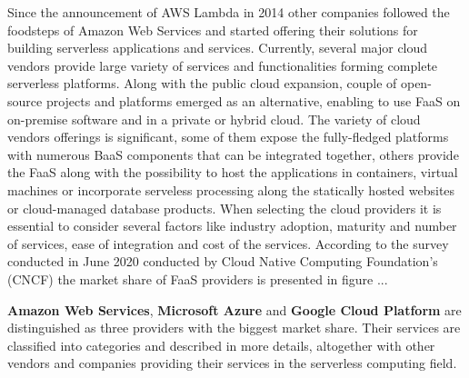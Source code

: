 Since the announcement of AWS Lambda in 2014 other companies followed the foodsteps of Amazon Web Services and started offering their solutions for building serverless applications and services. Currently, several major cloud vendors provide large variety of services and functionalities forming complete serverless platforms. Along with the public cloud expansion, couple of open-source projects and platforms emerged as an alternative, enabling to use FaaS on on-premise software and in a private or hybrid cloud. The variety of cloud vendors offerings is significant, some of them expose the fully-fledged platforms with numerous BaaS components that can be integrated together, others provide the FaaS along with the possibility to host the applications in containers, virtual machines or incorporate serveless processing along the statically hosted websites or cloud-managed database products. When selecting the cloud providers it is essential to consider several factors like industry adoption, maturity and number of services, ease of integration and cost of the services. According to the survey conducted in June 2020 conducted by Cloud Native Computing Foundation's (CNCF) \cite{CNCFServerlessSurvey2020} the market share of FaaS providers is presented in figure ...



\textbf{Amazon Web Services}, \textbf{Microsoft Azure} and \textbf{Google Cloud Platform} are distinguished as three providers with the biggest market share. Their services are classified into categories and described in more details, altogether with other vendors and companies providing their services in the serverless computing field.



